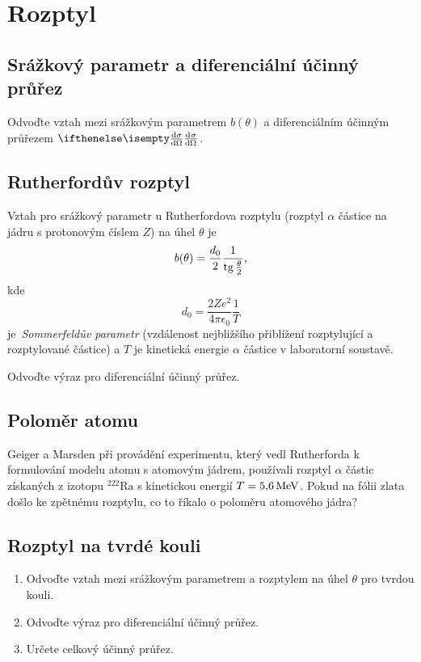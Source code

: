 \section{Rozptyl}
\subsection{Srážkový parametr a diferenciální účinný průřez}
    Odvoďte vztah mezi srážkovým parametrem $b(\theta)$ a diferenciálním účinným průřezem $\derivative{\sigma}{\Omega}$.

\subsection{Rutherfordův rozptyl}
    Vztah pro srážkový parametr u Rutherfordova rozptylu (rozptyl $\alpha$ částice na jádru s protonovým číslem $Z$) na úhel $\theta$ je
    \begin{equation}
        b(\theta)=\frac{d_{0}}{2}\frac{1}{\operatorname{tg}{\frac{\theta}{2}}},
    \end{equation}
    kde
    \begin{equation}
        d_{0}=\frac{2Ze^{2}}{4\pi\epsilon_{0}}\frac{1}{T}
    \end{equation}
    je~\emph{Sommerfeldův parametr} (vzdálenost nejbližšího přiblížení rozptylující a rozptylované částice) a $T$ je kinetická energie $\alpha$ částice v laboratorní soustavě.

    Odvoďte výraz pro diferenciální účinný průřez.

\subsection{Poloměr atomu}
    Geiger a Marsden při provádění experimentu, který vedl Rutherforda k formulování modelu atomu s atomovým jádrem, používali rozptyl $\alpha$ částic získaných z izotopu $^{222}\mathrm{Ra}$ s kinetickou energií $T=5,\!6\,\mathrm{{MeV}}$.
    Pokud na fólii zlata došlo ke zpětnému rozptylu, co to říkalo o poloměru atomového jádra?

\subsection{Rozptyl na tvrdé kouli}
    \begin{enumerate}
        \item Odvoďte vztah mezi srážkovým parametrem a rozptylem na úhel $\theta$ pro tvrdou kouli.
        \item Odvoďte výraz pro diferenciální účinný průřez.
        \item Určete celkový účinný průřez.
    \end{enumerate}
